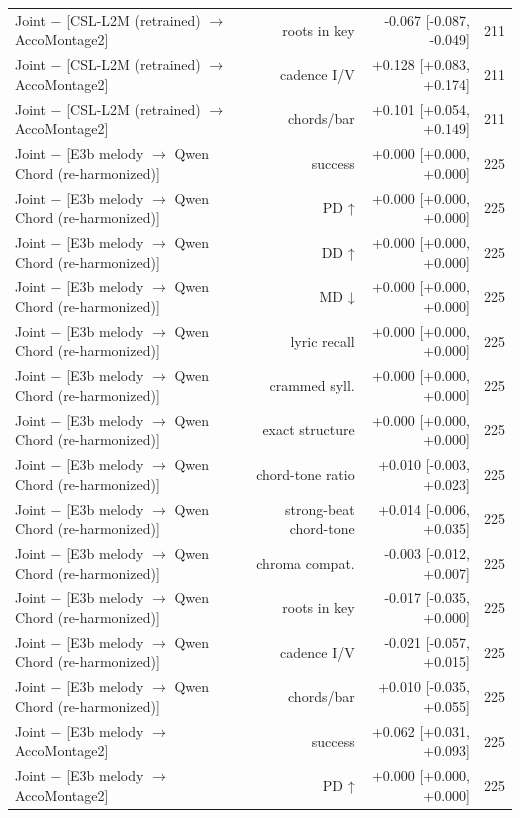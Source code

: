 \begin{table}[t]
\begin{tabular}{lrrr}
Joint $-$ [CSL-L2M (retrained) $\rightarrow$ AccoMontage2] & roots in key & -0.067 [-0.087, -0.049] & 211 \\
Joint $-$ [CSL-L2M (retrained) $\rightarrow$ AccoMontage2] & cadence I/V & +0.128 [+0.083, +0.174] & 211 \\
Joint $-$ [CSL-L2M (retrained) $\rightarrow$ AccoMontage2] & chords/bar & +0.101 [+0.054, +0.149] & 211 \\
Joint $-$ [E3b melody $\rightarrow$ Qwen Chord (re-harmonized)] & success & +0.000 [+0.000, +0.000] & 225 \\
Joint $-$ [E3b melody $\rightarrow$ Qwen Chord (re-harmonized)] & PD ↑ & +0.000 [+0.000, +0.000] & 225 \\
Joint $-$ [E3b melody $\rightarrow$ Qwen Chord (re-harmonized)] & DD ↑ & +0.000 [+0.000, +0.000] & 225 \\
Joint $-$ [E3b melody $\rightarrow$ Qwen Chord (re-harmonized)] & MD ↓ & +0.000 [+0.000, +0.000] & 225 \\
Joint $-$ [E3b melody $\rightarrow$ Qwen Chord (re-harmonized)] & lyric recall & +0.000 [+0.000, +0.000] & 225 \\
Joint $-$ [E3b melody $\rightarrow$ Qwen Chord (re-harmonized)] & crammed syll. & +0.000 [+0.000, +0.000] & 225 \\
Joint $-$ [E3b melody $\rightarrow$ Qwen Chord (re-harmonized)] & exact structure & +0.000 [+0.000, +0.000] & 225 \\
Joint $-$ [E3b melody $\rightarrow$ Qwen Chord (re-harmonized)] & chord-tone ratio & +0.010 [-0.003, +0.023] & 225 \\
Joint $-$ [E3b melody $\rightarrow$ Qwen Chord (re-harmonized)] & strong-beat chord-tone & +0.014 [-0.006, +0.035] & 225 \\
Joint $-$ [E3b melody $\rightarrow$ Qwen Chord (re-harmonized)] & chroma compat. & -0.003 [-0.012, +0.007] & 225 \\
Joint $-$ [E3b melody $\rightarrow$ Qwen Chord (re-harmonized)] & roots in key & -0.017 [-0.035, +0.000] & 225 \\
Joint $-$ [E3b melody $\rightarrow$ Qwen Chord (re-harmonized)] & cadence I/V & -0.021 [-0.057, +0.015] & 225 \\
Joint $-$ [E3b melody $\rightarrow$ Qwen Chord (re-harmonized)] & chords/bar & +0.010 [-0.035, +0.055] & 225 \\
Joint $-$ [E3b melody $\rightarrow$ AccoMontage2] & success & +0.062 [+0.031, +0.093] & 225 \\
Joint $-$ [E3b melody $\rightarrow$ AccoMontage2] & PD ↑ & +0.000 [+0.000, +0.000] & 225 \\

\end{tabular}
\end{table}
